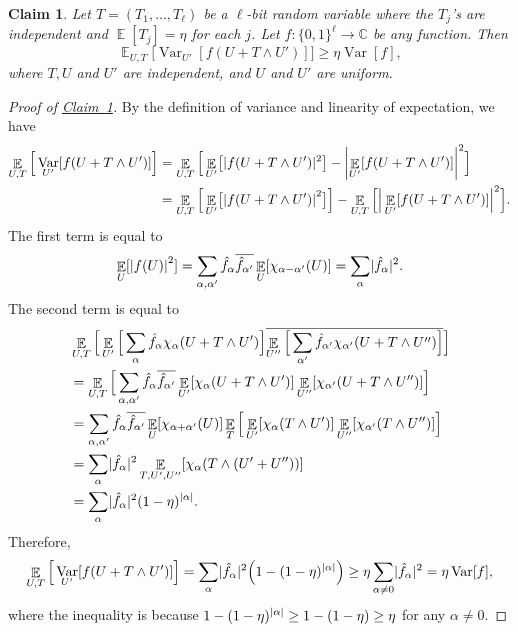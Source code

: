\documentclass[11pt]{article}
\numberwithin{equation}{section}
\newtheorem{claim}[theorem]{Claim}
\theoremstyle{definition}
\theoremstyle{plain}
\newcommand{\C}{\mathbb C}
\newcommand{\expref}[2]{\hyperref[#2]{#1~\ref{#2}}}
\newcommand{\zo}{\{0,1\}}
\def\Blocklength{\ell}
\def\hf{\hat f}
\DeclarePairedDelimiter{\abs}{\lvert}{\rvert}
\DeclareMathOperator*{\E}{\mathbb{E}}                 %
\DeclareMathOperator*{\Var}{Var}                 %
\begin{document}
  \begin{claim} \label{claim-der-var-noise}
    Let $T = (T_1, \ldots, T_\Blocklength)$ be a 
    $\ell$-bit  %
    random variable 
    where the $T_j$'s are independent and $\E[T_j] = \eta$ for each $j$.
    Let $f\colon \zo^\Blocklength \to \C$ be any function.
    Then
    \[
      \E_{U,T} \Big[ \Var_{U'}[f(U + T \wedge U')] \Big]
      \ge \eta \Var[f] ,
    \]
    where 
    $T,U$ and $U'$ are independent, and $U$ and $U'$ are uniform.
  \end{claim}
  \begin{proof}[Proof of {\expref{Claim}{claim-der-var-noise}}]
    By the definition of variance and linearity of expectation, we have
    \begin{align*}
      \E_{U,T} \Big[ \Var_{U'}[f(U + T \wedge U')] \Big]
      &= \E_{U,T} \Big[ \E_{U'} \bigl[ \abs{f(U + T \wedge U')}^2 \bigr] - \abs*{ \E_{U'}[f(U + T \wedge U')] }^2 \Big] \\
      &= \E_{U,T} \Big[ \E_{U'} \bigl[ \abs*{f(U + T \wedge U')}^2 \bigr] \Big] - \E_{U,T} \Big[ \Big| \E_{U'}[f(U + T \wedge U')] \Big|^2 \Big] .
    \end{align*}
    The first term is equal to
    \[
      \E_U[ \abs*{f(U)}^2 ]
      = \sum_{\alpha, \alpha'} \hf_\alpha \overline{\hf_{\alpha'}} \E_{U}[ \chi_{\alpha - \alpha'}(U) ]
      = \sum_{\alpha} \abs{\hf_\alpha}^2 .
    \]
    The second term is equal to
    \begin{align*}
      &\E_{U,T} \Big[ \E_{U'} \Big[ \sum_\alpha \hf_\alpha \chi_\alpha(U + T \wedge U') \Big] \overline{ \E_{U''} \Big[ \sum_{\alpha'} \hf_{\alpha'} \chi_{\alpha'}(U + T \wedge U'') \Big]} \Big] \\
      &= \E_{U,T} \Big[ \sum_{\alpha, \alpha'} \hf_\alpha \overline{\hf_{\alpha'}} \E_{U'}[ \chi_{\alpha}(U + T \wedge U') ] \E_{U''}[ \chi_{\alpha'}(U + T \wedge U'') ] \Big] \\
      &= \sum_{\alpha, \alpha'} \hf_\alpha \overline{\hf_{\alpha'}} \E_{U}[ \chi_{\alpha + \alpha'}(U) ] \E_T \Big[ \E_{U'}[ \chi_\alpha(T \wedge U') ] \E_{U''}[ \chi_{\alpha'}(T \wedge U'') ] \Big] \\
      &= \sum_{\alpha} \abs{\hf_\alpha}^2 \E_{T,U',U''} [ \chi_{\alpha}(T \wedge (U' + U'')) ] \\
      &= \sum_{\alpha} \abs{\hf_\alpha}^2 (1 - \eta)^{\abs{\alpha}} .
    \end{align*}
    Therefore,
    \begin{align*}
      \E_{U,T} \Big[ \Var_{U'}[f(U + T \wedge U')] \Big]
      = \sum_\alpha \abs{\hf_\alpha}^2 \Big(1 - (1 - \eta)^{\abs{\alpha}} \Big)
      \ge \eta \sum_{\alpha \neq 0} \abs{\hf_\alpha}^2
      = \eta \Var[f],
    \end{align*}
    where the inequality is because $1 - (1 - \eta)^{\abs{\alpha}} \ge 1
    - (1 - \eta) \ge \eta$ for any $\alpha \neq 0$.
  \end{proof}
\end{document}
